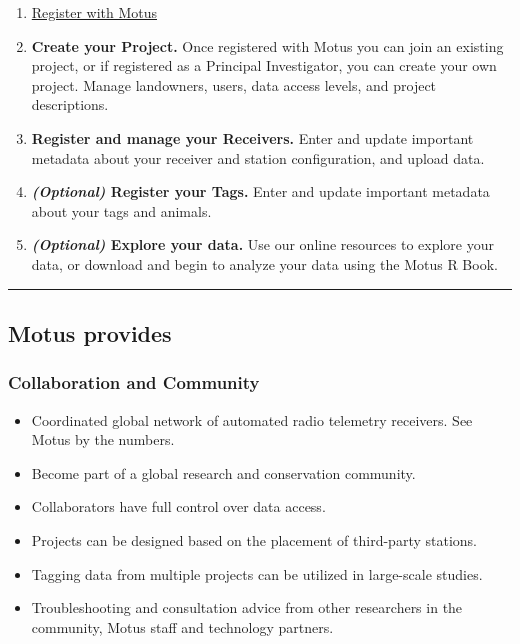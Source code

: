 \documentclass[
]{article}
\providecommand{\tightlist}{%
  \setlength{\itemsep}{0pt}\setlength{\parskip}{0pt}}
\begin{document}
\begin{enumerate}
\def\labelenumi{\arabic{enumi}.}
\tightlist
\item
  \href{https://motus.org/data/user/new}{Register with Motus}
\item
  \textbf{Create your Project.} Once registered with Motus you can join
  an existing project, or if registered as a Principal Investigator, you
  can create your own project. Manage landowners, users, data access
  levels, and project descriptions.
\item
  \textbf{Register and manage your Receivers.} Enter and update
  important metadata about your receiver and station configuration, and
  upload data.
\item
  \textbf{\emph{(Optional)} Register your Tags.} Enter and update
  important metadata about your tags and animals.
\item
  \textbf{\emph{(Optional)} Explore your data.} Use our online resources
  to explore your data, or download and begin to analyze your data using
  the Motus R Book.
\end{enumerate}

\begin{center}\rule{0.5\linewidth}{0.5pt}\end{center}

\hypertarget{motus-provides}{%
\subsection{Motus provides}\label{motus-provides}}

\hypertarget{collaboration-and-community}{%
\subsubsection{Collaboration and
Community}\label{collaboration-and-community}}

\begin{itemize}
\tightlist
\item
  Coordinated global network of automated radio telemetry receivers. See
  Motus by the numbers.
\item
  Become part of a global research and conservation community.
\item
  Collaborators have full control over data access.
\item
  Projects can be designed based on the placement of third-party
  stations.
\item
  Tagging data from multiple projects can be utilized in large-scale
  studies.
\item
  Troubleshooting and consultation advice from other researchers in the
  community, Motus staff and technology partners.
\end{itemize}
\end{document}
